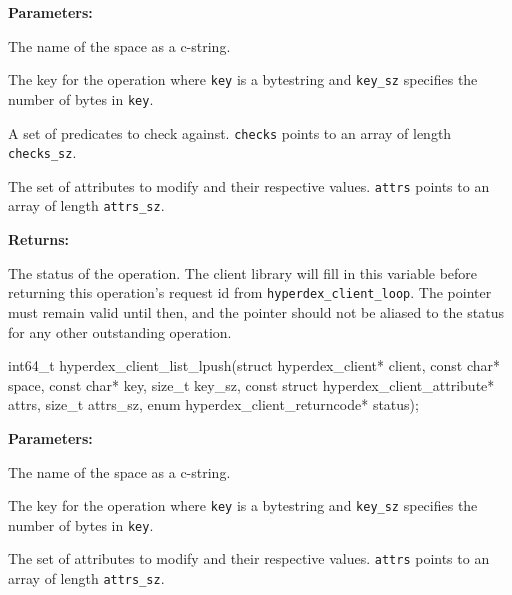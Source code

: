 \noindent\textbf{Parameters:}
\begin{description}[labelindent=\widthof{{\texttt{checks}, \texttt{checks\_sz}}},leftmargin=*,noitemsep,nolistsep,align=right]
\item[\texttt{space}] The name of the space as a c-string.
\item[\texttt{key}, \texttt{key\_sz}] The key for the operation where \texttt{key} is a bytestring and \texttt{key\_sz} specifies the number of bytes in \texttt{key}.
\item[\texttt{checks}, \texttt{checks\_sz}] A set of predicates to check against.  \texttt{checks} points to an array of length \texttt{checks\_sz}.
\item[\texttt{attrs}, \texttt{attrs\_sz}] The set of attributes to modify and their respective values.  \texttt{attrs} points to an array of length \texttt{attrs\_sz}.
\end{description}

\noindent\textbf{Returns:}
\begin{description}[labelindent=\widthof{{\texttt{status}}},leftmargin=*,noitemsep,nolistsep,align=right]
\item[\texttt{status}] The status of the operation.  The client library will fill in this variable before returning this operation's request id from \texttt{hyperdex\_client\_loop}.  The pointer must remain valid until then, and the pointer should not be aliased to the status for any other outstanding operation.
\end{description}

\funcsep
\begin{ccode}
int64_t hyperdex_client_list_lpush(struct hyperdex_client* client,
                const char* space,
                const char* key, size_t key_sz,
                const struct hyperdex_client_attribute* attrs, size_t attrs_sz,
                enum hyperdex_client_returncode* status);
\end{ccode}
\funcdesc 

\noindent\textbf{Parameters:}
\begin{description}[labelindent=\widthof{{\texttt{attrs}, \texttt{attrs\_sz}}},leftmargin=*,noitemsep,nolistsep,align=right]
\item[\texttt{space}] The name of the space as a c-string.
\item[\texttt{key}, \texttt{key\_sz}] The key for the operation where \texttt{key} is a bytestring and \texttt{key\_sz} specifies the number of bytes in \texttt{key}.
\item[\texttt{attrs}, \texttt{attrs\_sz}] The set of attributes to modify and their respective values.  \texttt{attrs} points to an array of length \texttt{attrs\_sz}.
\end{description}

